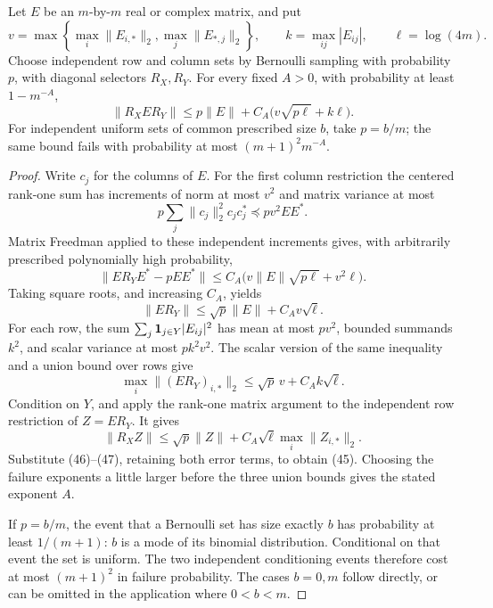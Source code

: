 \begin{lemma}
\label{lem:randomrestriction}
Let \(E\) be an \(m\)-by-\(m\) real or complex matrix, and put
\[
 v=\max\left\{\max_i\|E_{i,*}\|_2,\max_j\|E_{*,j}\|_2\right\},
 \qquad k=\max_{ij}|E_{ij}|,\qquad \ell=\log(4m).
\]
Choose independent row and column sets by Bernoulli sampling
with probability \(p\), with diagonal selectors \(R_X,R_Y\).
For every fixed \(A>0\), with probability at least \(1-m^{-A}\),
\[
 \|R_XER_Y\|
 \leq p\|E\|+C_A\bigl(v\sqrt{p\ell}+k\ell\bigr).             \tag{45}
\]
For independent uniform sets of common prescribed size \(b\),
take \(p=b/m\); the same bound fails with probability at most
\((m+1)^2m^{-A}\).
\end{lemma}
\begin{proof}
Write \(c_j\) for the columns of \(E\).
For the first column restriction the centered rank-one sum has
increments of norm at most \(v^2\) and matrix variance at most
\[
 p\sum_j\|c_j\|_2^2c_jc_j^*
             \preceq pv^2EE^*.
\]
Matrix Freedman applied to these independent increments gives,
with arbitrarily prescribed polynomially high probability,
\[
 \|ER_YE^*-pEE^*\|
 \leq C_A\bigl(v\|E\|\sqrt{p\ell}+v^2\ell\bigr).
\]
Taking square roots, and increasing \(C_A\), yields
\[
 \|ER_Y\|\leq\sqrt p\|E\|+C_Av\sqrt\ell.                     \tag{46}
\]
For each row, the sum
\(\sum_j\mathbf1_{j\in Y}|E_{ij}|^2\) has mean at most \(pv^2\),
bounded summands \(k^2\), and scalar variance at most
\(pk^2v^2\).
The scalar version of the same inequality and a union bound
over rows give
\[
 \max_i\|(ER_Y)_{i,*}\|_2\leq\sqrt p\,v+C_Ak\sqrt\ell.        \tag{47}
\]
Condition on \(Y\), and apply the rank-one matrix argument to
the independent row restriction of \(Z=ER_Y\).
It gives
\[
 \|R_XZ\|\leq\sqrt p\|Z\|
                   +C_A\sqrt\ell\max_i\|Z_{i,*}\|_2.
\]
Substitute (46)--(47), retaining both error terms, to obtain
(45). Choosing the failure exponents a little larger before
the three union bounds gives the stated exponent \(A\).

If \(p=b/m\), the event that a Bernoulli set has size exactly
\(b\) has probability at least \(1/(m+1)\): \(b\) is a mode
of its binomial distribution.
Conditional on that event the set is uniform.
The two independent conditioning events therefore cost at
most \((m+1)^2\) in failure probability.
The cases \(b=0,m\) follow directly, or can be omitted in the
application where \(0<b<m\).
\end{proof}

